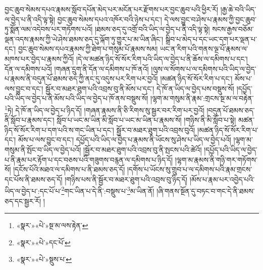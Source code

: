 བྱང་ཆུབ་སེམས་དཔའ་རྣམས་སློབ་དཔོན་མེད་པར་མངོན་པར་རྫོགས་པར་བྱང་ཆུབ་པའི་ཕྱིར་རོ། །རྒྱ་ཆེ་བའི་ཡིད་ལ་བྱེད་པ་ནི་འདི་ལྟ་སྟེ། བྱང་ཆུབ་སེམས་དཔའ་འཁོར་བའི་ཉེས་པ་དང་། དེ་ལས་བྱུང་བ་ཤེས་པ་རྣམས་ཀྱི་བྱང་ཆུབ་ཏུ་སྨོན་ལམ་འདེབས་པར་གཏོགས་པའོ། །ཐམས་ཅད་དུ་འགྲོ་བའི་ཡིད་ལ་བྱེད་པ་ནི་འདི་ལྟ་སྟེ། སངས་རྒྱས་བཅོམ་ལྡན་འདས་རྣམས་ཀྱི་ཡེ་ཤེས་ཐམས་ཅད་དུ་ལྐོག་ཏུ་གྱུར་པ་མ་ཡིན་ཞིང་། སྒྲིབ་པ་མེད་པ་དང་ཡང་དག་པར་ལྡན་པ་དང་། བྱང་ཆུབ་སེམས་དཔའ་རྣམས་ཀྱི་ཐེག་པ་གསུམ་པོ་རྣམས་སམ། ཡང་ན་རིག་པའི་གནས་ལྔ་པོ་རྣམས་ལ་མཁས་པར་བྱེད་པ་རྣམས་ཀྱིའོ། །དེ་ལ་མཚན་ཉིད་སོ་སོར་རིག་པའི་ཡིད་ལ་བྱེད་པ་ནི་ཆོས་ལ་དམིགས་པ་དང་། དོན་ལ་དམིགས་པའོ། །གཞན་དྲུག་ནི་དོན་ལ་དམིགས་པ་ཁོ་ནའོ། །ལུས་ལ་སོགས་པ་ལ་དམིགས་པའི་ཡིད་ལ་བྱེད་པ་རྣམས་ནི་བདུན་པོ་ཐམས་ཅད་ཀྱི་ནང་དུ་འདུས་པར་རིག་པར་བྱའོ། །མཚན་ཉིད་སོ་སོར་རིག་པ་དང་། མོས་པ་ལས་བྱུང་བ་དང་། སྦྱོར་བ་མཐར་ཐུག་པའི་འབྲས་བུ་ནི་མོས་པ་དང་། དེ་ཁོ་ན་ཡིད་ལ་བྱེད་པས་བསྡུས་སོ། །དཔྱོད་པའི་ཡིད་ལ་བྱེད་པ་ནི་མོས་པའི་ཡིད་ལ་བྱེད་པ་ཁོ་ནས་བསྡུས་སོ། །ལྷག་མ་གསུམ་ནི་རྣམ་:གྲངས་སྔ་མ་ལ་བརྟེན་\footnote{«སྣར་»«པེ་»སྔ་མ་ལས་རྟེན་}ཏེ། དེ་ཁོ་ན་ཡིད་ལ་བྱེད་པ་ཉིད་དོ། །གཞན་རྣམས་ནི་ཅི་རིགས་སུ་སྦྱར་བར་རིག་པར་བྱའོ། །བདུན་པོ་ཐམས་ཅད་ནི་སློབ་པ་རྣམས་དང་། སློབ་པ་ཡང་མ་ཡིན་མི་སློབ་པ་ཡང་མ་ཡིན་པ་རྣམས་སོ། །གཉིས་ནི་མི་སློབ་པ་སྟེ། མཚན་ཉིད་སོ་སོར་རིག་པ་དག་པའི་ས་གང་ཡིན་པ་དང་། སྦྱོར་བ་མཐར་ཐུག་པའི་འབྲས་བུའོ། །མཚན་ཉིད་སོ་སོར་རིག་པ་དང་། མོས་པ་ལས་བྱུང་བ་དང་། དཔྱོད་པའི་ཡིད་ལ་བྱེད་པ་རྣམས་ནི་ཡོངས་སུ་ཤེས་པ་ཡིད་ལ་བྱེད་པའོ། །ལྷག་མ་གསུམ་ནི་སྤོང་བ་ཡིད་ལ་བྱེད་པའོ། །སྦྱོར་བ་མཐར་ཐུག་པའི་འབྲས་བུ་ནི་སྤངས་པའི་ཚེའོ། །དཔྱོད་པའི་ཡིད་ལ་བྱེད་པ་ནི་རྣམ་པར་རྟོག་པ་དང་བཅས་པའི་གཟུགས་བརྙན་ལ་དམིགས་པ་ཉིད་དོ། །ལྷག་མ་རྣམས་ནི་གཉི་གར་གཏོགས་སོ། །དངོས་པོའི་མཐའ་ལ་དམིགས་པ་ནི་ཐམས་ཅད་དོ། །དགོས་པ་ཡོངས་སུ་གྲུབ་པ་ལ་དམིགས་པའི་རྣམ་གྲངས་དང་པོས་ནི་ཐམས་ཅད་དོ། །གཉིས་པས་ནི་སྦྱོར་བ་མཐར་ཐུག་པའི་འབྲས་བུ་ཉིད་དོ། །མོས་པ་རྣམ་པར་འབྱེད་པའི་ཡིད་ལ་བྱེད་པ་:དང་པོ་པ་\footnote{«སྣར་»«པེ་»དང་པོ་}གང་ཡིན་པ་དེ་ནི་:བསྡུས་པ་\footnote{«སྣར་»«པེ་»སྡུས་པ་}མ་ཡིན་ནོ། །ཞི་གནས་སྔོན་དུ་བཏང་བ་གང་དེ་ནི་ཐམས་ཅད་དང་སྦྱར་རོ། །
